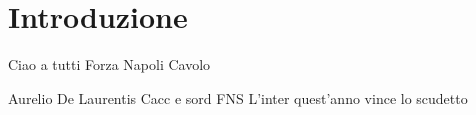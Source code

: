 \chapter*{Introduzione}
Ciao a tutti
Forza Napoli
Cavolo

Aurelio De Laurentis Cacc e sord
FNS
L'inter quest'anno vince lo scudetto

